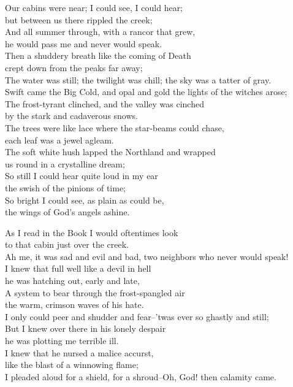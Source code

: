\begin{poemblock}
Our cabins were near; I could see, I could hear;\\
\idt but between us there rippled the creek;\\
And all summer through, with a rancor that grew,\\
\idt he would pass me and never would speak.\\
Then a shuddery breath like the coming of Death\\
\idt crept down from the peaks far away;\\
The water was still; the twilight was chill; the sky was a tatter of gray.\\
Swift came the Big Cold, and opal and gold the lights of the witches arose;\\
The frost-tyrant clinched, and the valley was cinched\\
\idt by the stark and cadaverous snows.\\
The trees were like lace where the star-beams could chase,\\
\idt each leaf was a jewel agleam.\\
The soft white hush lapped the Northland and wrapped\\
\idt us round in a crystalline dream;\\
So still I could hear quite loud in my ear\\
\idt the swish of the pinions of time;\\
So bright I could see, as plain as could be,\\
\idt the wings of God's angels ashine.

As I read in the Book I would oftentimes look\\
\idt to that cabin just over the creek.\\
Ah me, it was sad and evil and bad, two neighbors who never would speak!\\
I knew that full well like a devil in hell\\
\idt he was hatching out, early and late,\\
A system to bear through the frost-spangled air\\
\idt the warm, crimson waves of his hate.\\
I only could peer and shudder and fear--'twas ever so ghastly and still;\\
But I knew over there in his lonely despair\\
\idt he was plotting me terrible ill.\\
I knew that he nursed a malice accurst,\\
\idt like the blast of a winnowing flame;\\
I pleaded aloud for a shield, for a shroud--Oh, God! then calamity came.


\end{poemblock}
